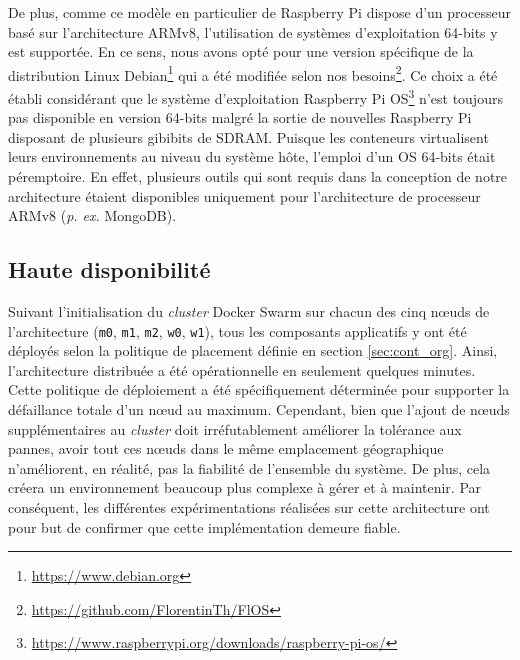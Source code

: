 De plus, comme ce modèle en particulier de Raspberry Pi dispose d'un processeur basé sur l'architecture ARMv8, l'utilisation de systèmes d'exploitation 64-bits y est supportée. En ce sens, nous avons opté pour une version spécifique de la distribution Linux Debian\footnote{\url{https://www.debian.org}} qui a été modifiée selon nos besoins\footnote{\url{https://github.com/FlorentinTh/FlOS}}. Ce choix a été établi considérant que le système d'exploitation Raspberry Pi OS\footnote{\url{https://www.raspberrypi.org/downloads/raspberry-pi-os/}} n'est toujours pas disponible en version 64-bits malgré la sortie de nouvelles Raspberry Pi disposant de plusieurs gibibits de SDRAM. Puisque les conteneurs virtualisent leurs environnements au niveau du système hôte, l'emploi d'un \acs{OS} 64-bits était péremptoire. En effet, plusieurs outils qui sont requis dans la conception de notre architecture étaient disponibles uniquement pour l'architecture de processeur ARMv8 (\textit{p. ex.} MongoDB).

\subsection{Haute disponibilité}

Suivant l'initialisation du \textit{cluster} Docker Swarm sur chacun des cinq n\oe{}uds de l'architecture (\texttt{m0}, \texttt{m1}, \texttt{m2}, \texttt{w0}, \texttt{w1}), tous les composants applicatifs y ont été déployés selon la politique de placement définie en section \ref{sec:cont_org}. Ainsi, l'architecture distribuée a été opérationnelle en seulement quelques minutes. Cette politique de déploiement a été spécifiquement déterminée pour supporter la défaillance totale d'un n\oe{}ud au maximum. Cependant, bien que l'ajout de n\oe{}uds supplémentaires au \textit{cluster} doit irréfutablement améliorer la tolérance aux pannes, avoir tout ces n\oe{}uds dans le même emplacement géographique n'améliorent, en réalité, pas la fiabilité de l'ensemble du système. De plus, cela créera un environnement beaucoup plus complexe à gérer et à maintenir. Par conséquent, les différentes expérimentations réalisées sur cette architecture ont pour but de confirmer que cette implémentation demeure fiable.

